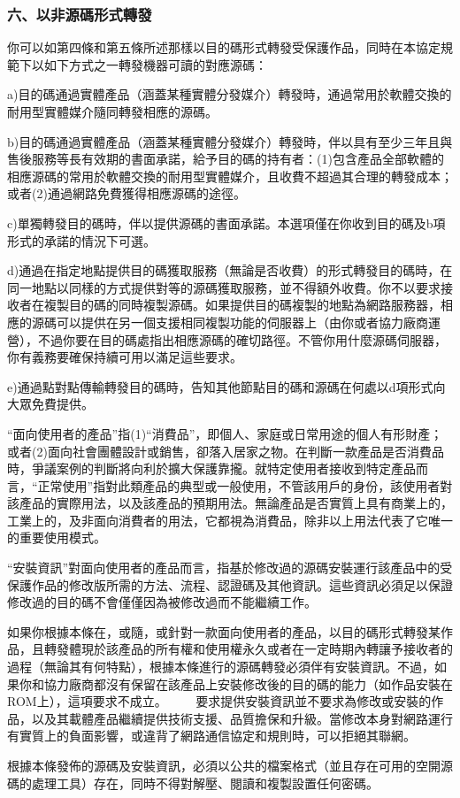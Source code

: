 \subsubsection{六、以非源碼形式轉發}
你可以如第四條和第五條所述那樣以目的碼形式轉發受保護作品，同時在本協定規範下以如下方式之一轉發機器可讀的對應源碼：\par
a)目的碼通過實體產品（涵蓋某種實體分發媒介）轉發時，通過常用於軟體交換的耐用型實體媒介隨同轉發相應的源碼。\par
b)目的碼通過實體產品（涵蓋某種實體分發媒介）轉發時，伴以具有至少三年且與售後服務等長有效期的書面承諾，給予目的碼的持有者：(1)包含產品全部軟體的相應源碼的常用於軟體交換的耐用型實體媒介，且收費不超過其合理的轉發成本；或者(2)通過網路免費獲得相應源碼的途徑。\par
c)單獨轉發目的碼時，伴以提供源碼的書面承諾。本選項僅在你收到目的碼及b項形式的承諾的情況下可選。\par
d)通過在指定地點提供目的碼獲取服務（無論是否收費）的形式轉發目的碼時，在同一地點以同樣的方式提供對等的源碼獲取服務，並不得額外收費。你不以要求接收者在複製目的碼的同時複製源碼。如果提供目的碼複製的地點為網路服務器，相應的源碼可以提供在另一個支援相同複製功能的伺服器上（由你或者協力廠商運營），不過你要在目的碼處指出相應源碼的確切路徑。不管你用什麼源碼伺服器，你有義務要確保持續可用以滿足這些要求。\par
e)通過點對點傳輸轉發目的碼時，告知其他節點目的碼和源碼在何處以d項形式向大眾免費提供。\par
“面向使用者的產品”指(1)“消費品”，即個人、家庭或日常用途的個人有形財產；或者(2)面向社會團體設計或銷售，卻落入居家之物。在判斷一款產品是否消費品時，爭議案例的判斷將向利於擴大保護靠攏。就特定使用者接收到特定產品而言，“正常使用”指對此類產品的典型或一般使用，不管該用戶的身份，該使用者對該產品的實際用法，以及該產品的預期用法。無論產品是否實質上具有商業上的，工業上的，及非面向消費者的用法，它都視為消費品，除非以上用法代表了它唯一的重要使用模式。\par
“安裝資訊”對面向使用者的產品而言，指基於修改過的源碼安裝運行該產品中的受保護作品的修改版所需的方法、流程、認證碼及其他資訊。這些資訊必須足以保證修改過的目的碼不會僅僅因為被修改過而不能繼續工作。\par
如果你根據本條在，或隨，或針對一款面向使用者的產品，以目的碼形式轉發某作品，且轉發體現於該產品的所有權和使用權永久或者在一定時期內轉讓予接收者的過程（無論其有何特點），根據本條進行的源碼轉發必須伴有安裝資訊。不過，如果你和協力廠商都沒有保留在該產品上安裝修改後的目的碼的能力（如作品安裝在ROM上），這項要求不成立。 　　要求提供安裝資訊並不要求為修改或安裝的作品，以及其載體產品繼續提供技術支援、品質擔保和升級。當修改本身對網路運行有實質上的負面影響，或違背了網路通信協定和規則時，可以拒絕其聯網。\par
根據本條發佈的源碼及安裝資訊，必須以公共的檔案格式（並且存在可用的空開源碼的處理工具）存在，同時不得對解壓、閱讀和複製設置任何密碼。
